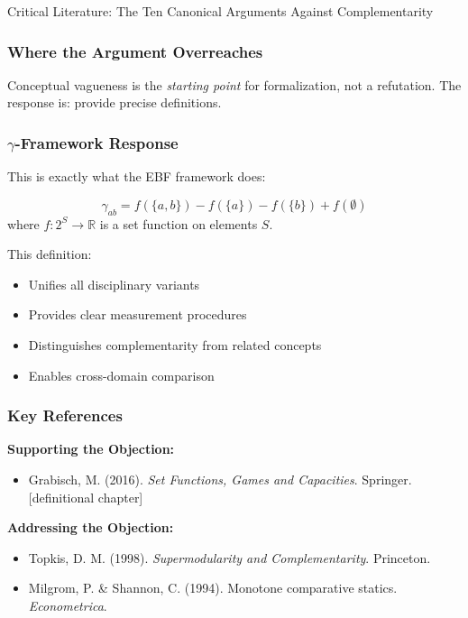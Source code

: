 \begin{chapter}{Critical Literature: The Ten Canonical Arguments Against Complementarity}
\subsubsection{Where the Argument Overreaches}

Conceptual vagueness is the \textit{starting point} for formalization, not a refutation. The response is: provide precise definitions.

\subsubsection{$\gamma$-Framework Response}

This is exactly what the EBF framework does:

\begin{definition}
\[
\gamma_{ab} = f(\{a,b\}) - f(\{a\}) - f(\{b\}) + f(\emptyset)
\]
where $f: 2^S \to \mathbb{R}$ is a set function on elements $S$.
\end{definition}

This definition:
\begin{itemize}[noitemsep]
    \item Unifies all disciplinary variants
    \item Provides clear measurement procedures
    \item Distinguishes complementarity from related concepts
    \item Enables cross-domain comparison
\end{itemize}

\subsubsection{Key References}

\textbf{Supporting the Objection:}
\begin{itemize}[noitemsep]
    \item Grabisch, M. (2016). \textit{Set Functions, Games and Capacities}. Springer. [definitional chapter]
\end{itemize}

\textbf{Addressing the Objection:}
\begin{itemize}[noitemsep]
    \item Topkis, D. M. (1998). \textit{Supermodularity and Complementarity}. Princeton.
    \item Milgrom, P. \& Shannon, C. (1994). Monotone comparative statics. \textit{Econometrica}.
\end{itemize}


\end{chapter}
